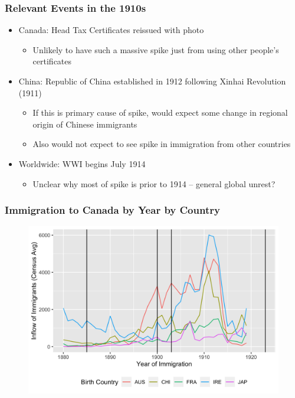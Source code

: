 \documentclass[pdf]{beamer}
\begin{document}
\begin{frame}[label = events1912]
	\frametitle{Relevant Events in the 1910s}
	\begin{itemize}
        \item Canada: Head Tax Certificates reissued with photo 
        \begin{itemize}
            \item Unlikely to have such a massive spike just from using other people's certificates 
        \end{itemize}
        \item China: Republic of China established in 1912 following Xinhai Revolution (1911)
        \begin{itemize}
            \item If this is primary cause of spike, would expect some change in regional origin of Chinese immigrants \hyperlink{originchi}{}
            \item Also would not expect to see spike in immigration from other countries \hyperlink{yrimmall}{}
        \end{itemize}
        \item Worldwide: WWI begins July 1914
        \begin{itemize}
            \item Unclear why most of spike is prior to 1914 -- general global unrest?
        \end{itemize}
    \end{itemize}
\end{frame}

\begin{frame}[label = yrimmall]
	\frametitle{Immigration to Canada by Year by Country}
    \centering
	\begin{figure}[H]
		\begin{center}
			\includegraphics[width=\textwidth]{../../figs/yrimmall.png}
		\end{center}
	\end{figure}
\end{frame}
\end{document}
